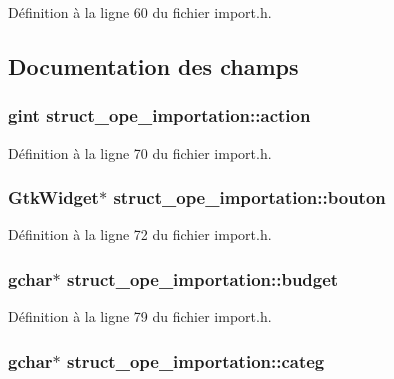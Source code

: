 Définition à la ligne 60 du fichier import.h.



\subsection{Documentation des champs}
\subsubsection[{action}]{\setlength{\rightskip}{0pt plus 5cm}gint {\bf struct\_\-ope\_\-importation::action}}\label{structstruct__ope__importation_a3dffaa080a9fc75d32af4353c9eab627}


Définition à la ligne 70 du fichier import.h.

\subsubsection[{bouton}]{\setlength{\rightskip}{0pt plus 5cm}GtkWidget$\ast$ {\bf struct\_\-ope\_\-importation::bouton}}\label{structstruct__ope__importation_a971aa1abd415f4c6a78c2e991bbd6978}


Définition à la ligne 72 du fichier import.h.

\subsubsection[{budget}]{\setlength{\rightskip}{0pt plus 5cm}gchar$\ast$ {\bf struct\_\-ope\_\-importation::budget}}\label{structstruct__ope__importation_a6f43995ba43d76590e8c3324db78f150}


Définition à la ligne 79 du fichier import.h.

\subsubsection[{categ}]{\setlength{\rightskip}{0pt plus 5cm}gchar$\ast$ {\bf struct\_\-ope\_\-importation::categ}}\label{structstruct__ope__importation_afa6a9d44530054f14c841f799dc0b723}


